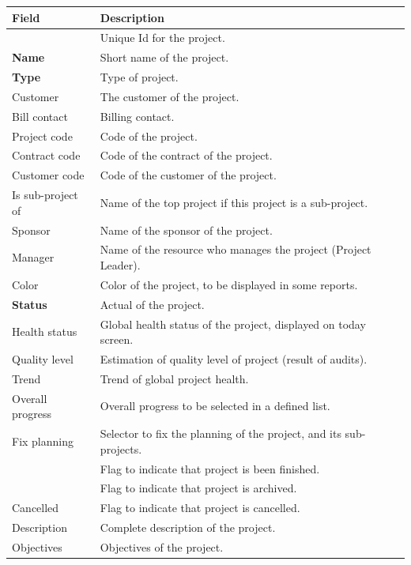 \documentclass[letterpaper,10pt,english]{sphinxmanual}
\begin{document}
\begin{tabulary}{\linewidth}{|l|l|}
\hline
\textsf{\relax 
Field
} & \textsf{\relax 
Description
}\\
\hline
{\hyperref[Glossary:term-id]{\emph{}}}
 & 
Unique Id for the project.
\\
\hline
\textbf{Name}
 & 
Short name of the project.
\\
\hline
\textbf{Type}
 & 
Type of project.
\\
\hline
Customer
 & 
The customer of the project.
\\
\hline
Bill contact
 & 
Billing contact.
\\
\hline
Project code
 & 
Code of the project.
\\
\hline
Contract code
 & 
Code of the contract of the project.
\\
\hline
Customer code
 & 
Code of the customer of the project.
\\
\hline
Is sub-project of
 & 
Name of the top project if this project is a sub-project.
\\
\hline
Sponsor
 & 
Name of the sponsor of the project.
\\
\hline
Manager
 & 
Name of the resource who manages the project (Project Leader).
\\
\hline
Color
 & 
Color of the project, to be displayed in some reports.
\\
\hline
\textbf{Status}
 & 
Actual {\hyperref[Glossary:term-status]{\emph{}}} of the project.
\\
\hline
Health status
 & 
Global health status of the project, displayed on today screen.
\\
\hline
Quality level
 & 
Estimation of quality level of project (result of audits).
\\
\hline
Trend
 & 
Trend of global project health.
\\
\hline
Overall progress
 & 
Overall progress to be selected in a defined list.
\\
\hline
Fix planning
 & 
Selector to fix the planning of the project, and its sub-projects.
\\
\hline
{\hyperref[Glossary:term-done]{\emph{}}}
 & 
Flag to indicate that project is been finished.
\\
\hline
{\hyperref[Glossary:term-closed]{\emph{}}}
 & 
Flag to indicate that project is archived.
\\
\hline
Cancelled
 & 
Flag to indicate that project is cancelled.
\\
\hline
Description
 & 
Complete description of the project.
\\
\hline
Objectives
 & 
Objectives of the project.
\\
\hline\end{tabulary}
\end{document}
